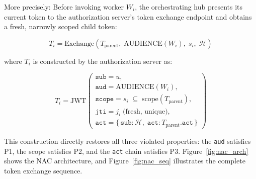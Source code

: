 \documentclass[journal]{IEEEtran}
\begin{document}
More precisely: Before invoking worker $W_i$, the orchestrating hub presents its
current token to the authorization server's token exchange endpoint and obtains a
fresh, narrowly scoped child token:

\begin{equation}
T_i = \mathrm{Exchange}\!\left(
  T_{\mathrm{parent}},\;
  \mathrm{AUDIENCE}(W_i),\;
  s_i,\;
  \mathcal{H}
\right)
\label{eq:exchange}
\end{equation}

where $T_i$ is constructed by the authorization server as:

\begin{equation}
T_i = \mathrm{JWT}\!\left(\begin{array}{l}
  \texttt{sub} = u, \\[2pt]
  \texttt{aud} = \mathrm{AUDIENCE}(W_i), \\[2pt]
  \texttt{scope} = s_i \;\subseteq\; \mathrm{scope}(T_{\mathrm{parent}}), \\[2pt]
  \texttt{jti} = j_i \;\text{(fresh, unique)}, \\[2pt]
  \texttt{act} = \{\,\texttt{sub}\text{:}\,\mathcal{H},\;
                    \texttt{act}\text{:}\,T_{\mathrm{parent}}.\texttt{act}\,\}
\end{array}\right)
\label{eq:child}
\end{equation}

This construction directly restores all three violated properties: the
\texttt{aud} satisfies P1, the scope satisfies P2, and the \texttt{act} chain
satisfies P3. Figure~\ref{fig:nac_arch} shows the NAC architecture, and
Figure~\ref{fig:nac_seq} illustrates the complete token exchange sequence.
\end{document}

